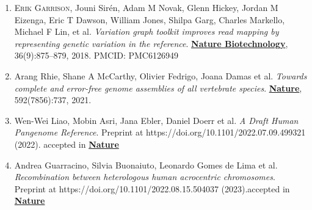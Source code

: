 \documentclass{nihbiosketch}
\newcommand{\hijournal}[1]{{\bf {\uline{#1}}}}
\begin{document}
\begin{statement}


\begin{enumerate}[label=\alph*.]

\item \textsc{Erik Garrison}, Jouni Sirén, Adam M Novak, Glenn Hickey, Jordan M Eizenga, Eric T Dawson, William Jones, Shilpa Garg, Charles Markello, Michael F Lin, et al. \emph{Variation graph toolkit improves read mapping by representing genetic variation in the reference}. \hijournal{Nature Biotechnology}, 36(9):875–879, 2018. PMCID: PMC6126949




\item Arang Rhie, Shane A McCarthy, Olivier Fedrigo, Joana Damas et al. \emph{Towards complete and error-free genome assemblies of all vertebrate species}. \hijournal{Nature}, 592(7856):737, 2021.

\item Wen-Wei Liao, Mobin Asri, Jana Ebler, Daniel Doerr et al. \emph{A Draft Human Pangenome Reference}.
Preprint at https://doi.org/10.1101/2022.07.09.499321 (2022). accepted in \hijournal{Nature}

\item Andrea Guarracino, Silvia Buonaiuto, Leonardo Gomes de Lima et al. \emph{Recombination between heterologous human acrocentric chromosomes}. Preprint at https://doi.org/10.1101/2022.08.15.504037 (2023).accepted in \hijournal{Nature}


\end{enumerate}

\end{statement}
\end{document}
